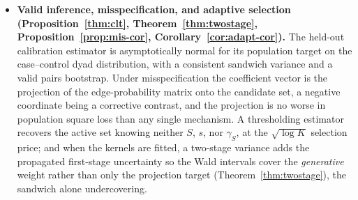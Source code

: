 \documentclass[12pt]{article}
\newcommand{\1}{\mathbf{1}}
\begin{document}
\begin{itemize}[leftmargin=1.4em,itemsep=3pt]
\item \textbf{Valid inference, misspecification, and adaptive selection
(Proposition~\ref{thm:clt}, Theorem~\ref{thm:twostage}, Proposition~\ref{prop:mis-cor},
Corollary~\ref{cor:adapt-cor}).} The held-out calibration estimator is asymptotically normal for its
population target on the case--control dyad distribution, with a consistent sandwich variance and a valid pairs
bootstrap. Under misspecification the coefficient vector is the projection of the edge-probability matrix onto
the candidate set, a negative coordinate being a corrective contrast, and the projection is no worse in
population square loss than any single mechanism. A thresholding estimator recovers the active set knowing
neither $S$, $s$, nor $\gamma_S$, at the $\sqrt{\log K}$ selection price; and when the kernels are fitted, a
two-stage variance adds the propagated first-stage uncertainty so the Wald intervals cover the \emph{generative}
weight rather than only the projection target (Theorem~\ref{thm:twostage}), the sandwich alone undercovering.

\end{itemize}
\end{document}
